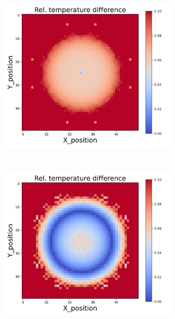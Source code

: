 {\begin{figure}[h]
\begin{minipage}{\textwidth}
\begin{subfigure}{0.27\textwidth}
        \end{subfigure}
        \begin{subfigure}{0.27\textwidth}
            \centering
            \includegraphics[width=\textwidth]{figures/raw_data/21/lin_square/T_bias.jpg}
        \end{subfigure}
    \end{minipage}\\
    \begin{minipage}{\textwidth}
        \centering
        \begin{subfigure}{0.27\textwidth}
            \centering
            \includegraphics[width=\textwidth]{figures/raw_data/22/lin_square/T_bias.jpg}

\end{subfigure}
\end{minipage}
\end{figure}}
